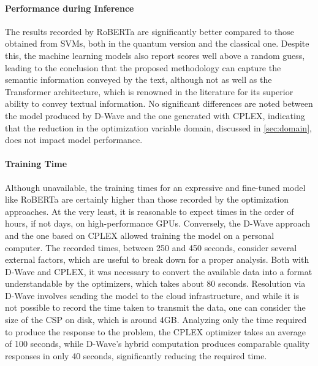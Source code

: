 \paragraph{Performance during Inference} The results recorded by RoBERTa are significantly better compared to those obtained from SVMs, both in the quantum version and the classical one. Despite this, the machine learning models also report scores well above a random guess, leading to the conclusion that the proposed methodology can capture the semantic information conveyed by the text, although not as well as the Transformer architecture, which is renowned in the literature for its superior ability to convey textual information. No significant differences are noted between the model produced by D-Wave and the one generated with CPLEX, indicating that the reduction in the optimization variable domain, discussed in \ref{sec:domain}, does not impact model performance.

\paragraph{Training Time} Although unavailable, the training times for an expressive and fine-tuned model like RoBERTa are certainly higher than those recorded by the optimization approaches. At the very least, it is reasonable to expect times in the order of hours, if not days, on high-performance GPUs. Conversely, the D-Wave approach and the one based on CPLEX allowed training the model on a personal computer. The recorded times, between 250 and 450 seconds, consider several external factors, which are useful to break down for a proper analysis. Both with D-Wave and CPLEX, it was necessary to convert the available data into a format understandable by the optimizers, which takes about 80 seconds. Resolution via D-Wave involves sending the model to the cloud infrastructure, and while it is not possible to record the time taken to transmit the data, one can consider the size of the CSP on disk, which is around 4GB. Analyzing only the time required to produce the response to the problem, the CPLEX optimizer takes an average of 100 seconds, while D-Wave's hybrid computation produces comparable quality responses in only 40 seconds, significantly reducing the required time.

